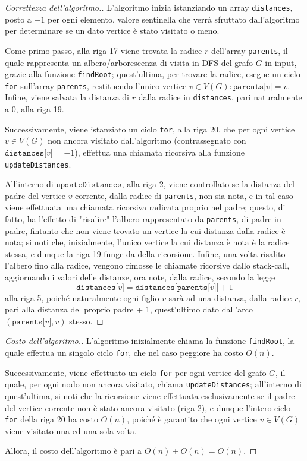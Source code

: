 \documentclass[a4paper, 12pt]{report}
\begin{document}
    \begin{proof}[Correttezza dell'algoritmo.]
        L'algoritmo inizia istanziando un array \texttt{distances}, posto a $-1$ per ogni elemento, valore sentinella che verrà sfruttato dall'algoritmo per determinare se un dato vertice è stato visitato o meno.

        Come primo passo, alla riga 17 viene trovata la radice $r$ dell'array \texttt{parents}, il quale rappresenta un albero/arborescenza di visita in DFS del grafo $G$ in input, grazie alla funzione \texttt{findRoot}; quest'ultima, per trovare la radice, esegue un ciclo \texttt{for} sull'array \texttt{parents}, restituendo l'unico vertice $v \in V(G) : \texttt{parents[}v\texttt{]} = v$. Infine, viene salvata la distanza di $r$ dalla radice in \texttt{distances}, pari naturalmente a 0, alla riga 19.

        Successivamente, viene istanziato un ciclo \texttt{for}, alla riga 20, che per ogni vertice $v \in V(G)$ non ancora visitato dall'algoritmo (contrassegnato con $\texttt{distances[}v\texttt{]} = -1$), effettua una chiamata ricorsiva alla funzione \texttt{updateDistances}.

        All'interno di $\texttt{updateDistances}$, alla riga 2, viene controllato se la distanza del padre del vertice $v$ corrente, dalla radice di \texttt{parents}, non sia nota, e in tal caso viene effettuata una chiamata ricorsiva radicata proprio nel padre; questo, di fatto, ha l'effetto di "risalire" l'albero rappresentato da \texttt{parents}, di padre in padre, fintanto che non viene trovato un vertice la cui distanza dalla radice è nota; si noti che, inizialmente, l'unico vertice la cui distanza è nota è la radice stessa, e dunque la riga 19 funge da  della ricorsione. Infine, una volta risalito l'albero fino alla radice, vengono rimosse le chiamate ricorsive dallo stack-call, aggiornando i valori delle distanze, ora note, dalla radice, secondo la legge $$\texttt{distances[}v\texttt{]} = \texttt{distances[parents[}v\texttt{]]} + 1$$ alla riga 5, poiché naturalmente ogni figlio $v$ sarà ad una distanza, dalla radice $r$, pari alla distanza del proprio padre + 1, quest'ultimo dato dall'arco $(\texttt{parents[}v\texttt{]}, v)$ stesso.
    \end{proof}

    \begin{proof}[Costo dell'algoritmo.]
        L'algoritmo inizialmente chiama la funzione \texttt{findRoot}, la quale effettua un singolo ciclo \texttt{for}, che nel caso peggiore ha costo $O(n)$.

        Successivamente, viene effettuato un ciclo \texttt{for} per ogni vertice del grafo $G$, il quale, per ogni nodo non ancora visitato, chiama \texttt{updateDistances}; all'interno di quest'ultima, si noti che la ricorsione viene effettuata esclusivamente se il padre del vertice corrente non è stato ancora visitato (riga 2), e dunque l'intero ciclo \texttt{for} della riga 20 ha costo $O(n)$, poiché è garantito che ogni vertice $v \in V(G)$ viene visitato una ed una sola volta.

        Allora, il costo dell'algoritmo è pari a $O(n) + O(n) = O(n)$.
    \end{proof}
\end{document}
